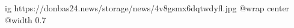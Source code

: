 
 
 
 
 

\ifcmt
  ig https://donbas24.news/storage/news/4v8gsmx6dqtwdyfl.jpg
  @wrap center
  @width 0.7
\fi
